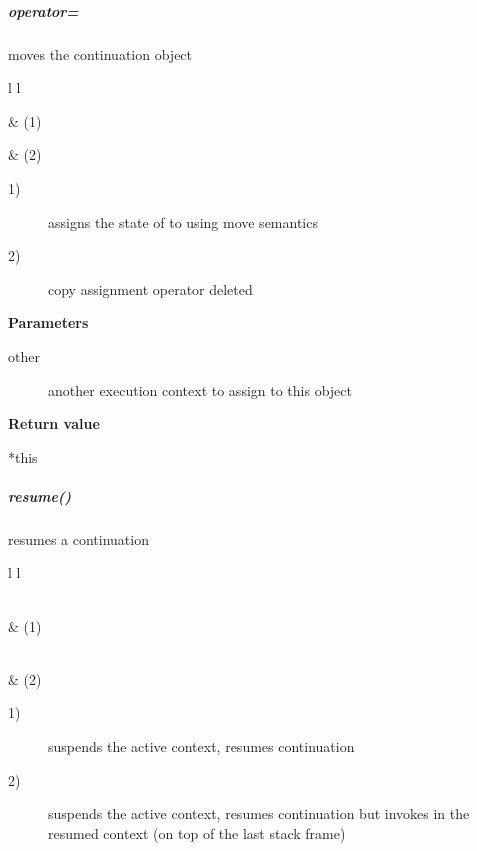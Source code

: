 \subparagraph*{operator=}
moves the continuation object\\

\begin{tabular}{ l l }
    \midrule

     & (1)\\

    \midrule

     & (2)\\

    \midrule
\end{tabular}

\begin{description}
    \item[1)] assigns the state of  to  using move semantics
    \item[2)] copy assignment operator deleted
\end{description}

{\bfseries Parameters}
\begin{description}
    \item[other]   another execution context to assign to this object\\
\end{description}

{\bfseries Return value}
\begin{description}
    \item[*this]
\end{description}


\subparagraph*{resume()}
resumes a continuation\\

\begin{tabular}{ l l }
    \midrule

    \\
     & (1)\\

    \midrule

    \\
     & (2)\\

    \midrule
\end{tabular}

\begin{description}
    \item[1)] suspends the active context, resumes continuation 
    \item[2)] suspends the active context, resumes continuation  but
              invokes  in the resumed context (on top of the
              last stack frame)
\end{description}

